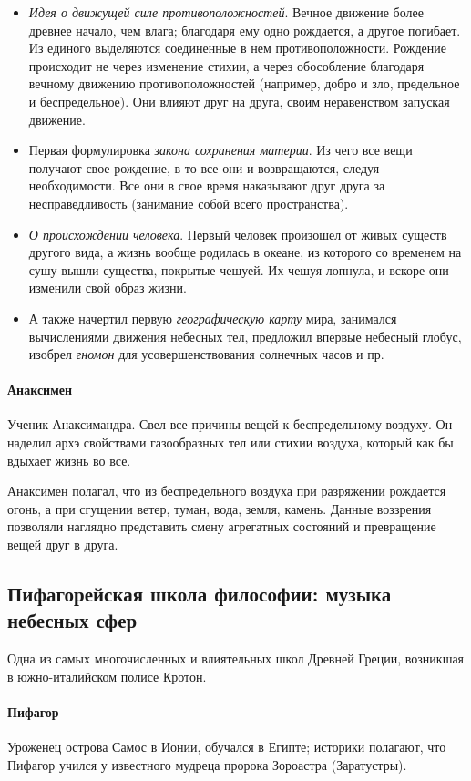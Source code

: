 \begin{itemize}
    \item \textit{Идея о движущей силе противоположностей}. Вечное движение более древнее начало, чем влага; благодаря ему одно рождается, а другое погибает. Из единого выделяются соединенные в нем противоположности.  Рождение происходит не через изменение стихии, а через обособление благодаря вечному движению противоположностей (например, добро и зло, предельное и беспредельное). Они влияют друг на друга, своим неравенством запуская движение.
    \item Первая формулировка \textit{закона сохранения материи}. Из чего все вещи получают свое рождение, в то все они и возвращаются, следуя необходимости. Все они в свое время наказывают друг друга за несправедливость (занимание собой всего пространства).
    \item \textit{О происхождении человека}. Первый человек произошел от живых существ другого вида, а жизнь вообще родилась в океане, из которого со временем на сушу вышли существа, покрытые чешуей. Их чешуя лопнула, и вскоре они изменили свой образ жизни.
    \item А также начертил первую \textit{географическую карту} мира, занимался вычислениями движения небесных тел, предложил впервые небесный глобус, изобрел \textit{гномон} для усовершенствования солнечных часов и пр.
\end{itemize}

\paragraph{Анаксимен} Ученик Анаксимандра. Свел все причины вещей к беспредельному
воздуху. Он наделил архэ свойствами газообразных тел или стихии воздуха, который как бы вдыхает жизнь во все.  

Анаксимен полагал, что из беспредельного воздуха при разряжении рождается огонь, а при сгущении ветер, туман, вода, земля, камень. Данные воззрения позволяли наглядно представить смену агрегатных состояний и превращение вещей друг в друга.

\subsection{Пифагорейская школа философии: музыка небесных сфер}

Одна из самых многочисленных и влиятельных школ Древней Греции, возникшая в южно-италийском полисе Кротон. 

\paragraph{Пифагор} Уроженец острова Самос в Ионии, обучался в Египте; историки полагают, что Пифагор учился у известного мудреца пророка Зороастра (Заратустры).


